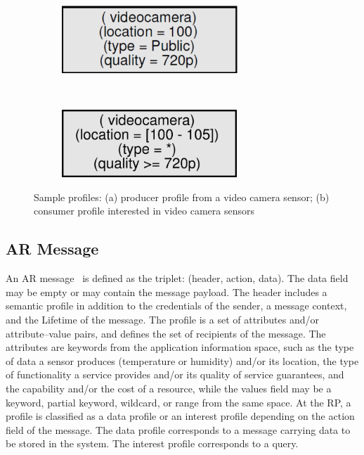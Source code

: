 \begin{figure}
    \centering
    \begin{subfigure}[t]{0.5\textwidth}
        \centering
        \includegraphics[height=1in]{Figures/data_profile.pdf}
        \caption{}
        \label{fig:data_profile}
    \end{subfigure}%
    ~ 
    \begin{subfigure}[t]{0.5\textwidth}
        \centering
        \includegraphics[height=1in]{Figures/interest_profile.pdf}
        \caption{}
        \label{fig:interest_profile}
    \end{subfigure}
    \caption{Sample profiles: (a) producer profile from a video camera sensor; (b) consumer profile interested in video camera sensors}
\end{figure}

\subsection{AR Message}
An AR message~\cite{meteor2008} is defined as the triplet: (header, action, data). The data field may be empty or may contain the message payload. The header includes a semantic profile in addition to the credentials of the sender, a message context, and the Lifetime of the message. The profile is a set of attributes and/or attribute–value pairs, and defines the set of recipients of the message. The attributes are keywords from the application information space, such as the type of data a sensor produces (temperature or humidity) and/or its location, the type of functionality a service provides and/or its quality of service guarantees, and the capability and/or the cost of a resource, while the values field may be a keyword, partial keyword, wildcard, or range from the same space. At the RP, a profile is classified as a data profile or an interest profile depending on the action field of the message. The data profile corresponds to a message carrying data to be stored in the system. The interest profile corresponds to a query.

